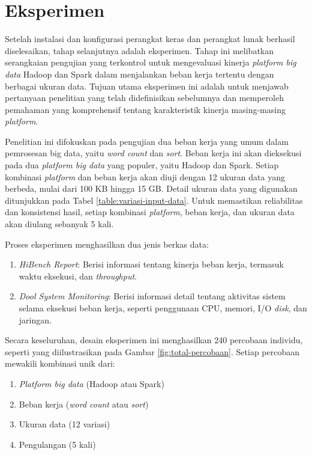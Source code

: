 \section{Eksperimen}
Setelah instalasi dan konfigurasi perangkat keras dan perangkat lunak berhasil diselesaikan, tahap selanjutnya adalah eksperimen. Tahap ini melibatkan serangkaian pengujian yang terkontrol untuk mengevaluasi kinerja \textit{platform big data} Hadoop dan Spark dalam menjalankan beban kerja tertentu dengan berbagai ukuran data. Tujuan utama eksperimen ini adalah untuk menjawab pertanyaan penelitian yang telah didefinisikan sebelumnya dan memperoleh pemahaman yang komprehensif tentang karakteristik kinerja masing-masing \textit{platform}.

Penelitian ini difokuskan pada pengujian dua beban kerja yang umum dalam pemrosesan big data, yaitu \textit{word count} dan \textit{sort}. Beban kerja ini akan dieksekusi pada dua \textit{platform big data} yang populer, yaitu Hadoop dan Spark. Setiap kombinasi \textit{platform} dan beban kerja akan diuji dengan 12 ukuran data yang berbeda, mulai dari 100 KB hingga 15 GB. Detail ukuran data yang digunakan ditunjukkan pada Tabel \ref{table:variasi-input-data}. Untuk memastikan reliabilitas dan konsistensi hasil, setiap kombinasi \textit{platform}, beban kerja, dan ukuran data akan diulang sebanyak 5 kali. 

Proses eksperimen menghasilkan dua jenis berkas data: 
\begin{enumerate}
	\item \textit{HiBench Report}: Berisi informasi tentang kinerja beban kerja, termasuk waktu eksekusi, dan \textit{throughput}.
	\item \textit{Dool System Monitoring}: Berisi informasi detail tentang aktivitas sistem selama eksekusi beban kerja, seperti penggunaan CPU, memori, I/O \textit{disk}, dan jaringan.
\end{enumerate}

Secara keseluruhan, desain eksperimen ini menghasilkan 240 percobaan individu, seperti yang diilustrasikan pada Gambar \ref{fig:total-percobaan}. Setiap percobaan mewakili kombinasi unik dari:
\begin{enumerate}
	\item \textit{Platform big data} (Hadoop atau Spark)
	\item Beban kerja (\textit{word count} atau \textit{sort})
	\item Ukuran data (12 variasi)
	\item Pengulangan (5 kali)
\end{enumerate}

